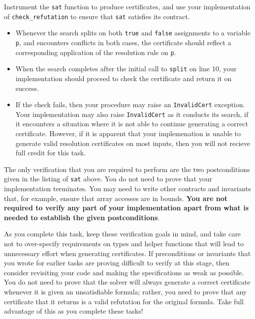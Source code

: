 \documentclass[11pt]{article}
\begin{document}
\begin{task}[20 points]
Instrument the \verb'sat' function to produce certificates, and use your implementation of \verb'check_refutation' to ensure that \verb'sat' satisfies its contract.
\begin{itemize}

\item Whenever the search splits on both \verb'true' and \verb'false' assignments to a variable \verb'p', and encounters conflicts in both cases, the certificate should reflect a corresponding application of the resolution rule on \verb'p'. 

\item When the search completes after the initial call to \verb'split' on line 10, your implementation should proceed to check the certificate and return it on success.

\item If the check fails, then your procedure may raise an \verb'InvalidCert' exception. Your implementation may also raise \verb'InvalidCert' as it conducts its search, if it encounters a situation where it is not able to continue generating a correct certificate. However, if it is apparent that your implemenation is unable to generate valid resolution certificates on most inputs, then you will not recieve full credit for this task.
\end{itemize}
\end{task}
The only verification that you are required to perform are the two postconditions given in the listing of \verb'sat' above. You do not need to prove that your implementation terminates. You may need to write other contracts and invariants that, for example, ensure that array accesses are in bounds. \textbf{You are not required to verify any part of your implementation apart from what is needed to establish the given postconditions}. 

As you complete this task, keep these verification goals in mind, and take care not to over-specify requirements on types and helper functions that will lead to unnecessary effort when generating certificates.
If preconditions or invariants that you wrote for earlier tasks are proving difficult to verify at this stage, then consider revisiting your code and making the specifications as weak as possible.
You do not need to prove that the solver will always generate a correct certificate whenever it is given an unsatisfiable formula; rather, you need to prove that any certificate that it returns is a valid refutation for the original formula.
Take full advantage of this as you complete these tasks!
\end{document}
